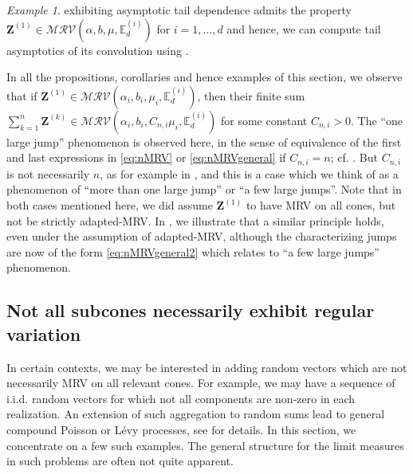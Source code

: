 \documentclass[aos]{imsart}
\numberwithin{equation}{section}
\theoremstyle{plain} %
\theoremstyle{remark}
\newtheorem{example}[theorem]{Example}
\newcommand{\E}{\mathbb{E}}
\def\MRV{\mathcal{MRV}}
\def\bZ{\boldsymbol Z}
\begin{document}
\begin{example}
  exhibiting asymptotic tail dependence admits the property $\bZ^{(1)}\in\MRV(\alpha,b,\mu,\E_d^{(i)})$ for $i=1,\ldots, d$  and hence, we can compute tail asymptotics  of its convolution using .
\end{example}
In all the propositions, corollaries and hence examples of this section, we observe that if $\bZ^{(1)} \in \MRV(\alpha_i, b_i, \mu_i, \E_d^{(i)})$, then their finite sum $\sum_{k=1}^n \bZ^{(k)} \in \MRV(\alpha_i, b_i, C_{n,i} \mu_i, \E_d^{(i)})$
for some constant $C_{n,i}>0$. The ``one large jump'' phenomenon is observed here, in the sense of equivalence of the first and last expressions in \eqref{eq:nMRV} or \eqref{eq:nMRVgeneral} if $C_{n,i}=n$; cf. . But $C_{n,i}$ is not necessarily $n$, as for example in , and this is a case which we think of as a phenomenon of ``more than one large jump'' or ``a few large jumps''.  Note that in both cases mentioned here, we did assume  $\bZ^{(1)}$ to have MRV on all cones, but not be strictly adapted-MRV. In , we illustrate that a similar principle holds, even under the assumption of adapted-MRV, although the characterizing jumps are now of the form \eqref{eq:nMRVgeneral2} which relates to ``a few large jumps'' phenomenon. 


\subsection{Not all subcones necessarily exhibit regular variation} \label{subsec:nohrvinallcone}
In certain contexts, we may be interested in adding random vectors which are not necessarily MRV on all relevant cones. For example, we may have a sequence of  i.i.d.  random vectors for which not all components are non-zero in each realization. An extension of such aggregation to random sums lead to general compound Poisson or L\'evy processes, see  for details. In this section, we concentrate on a few such examples. The general structure for the limit measures in such problems are often not quite apparent.
\end{document}

